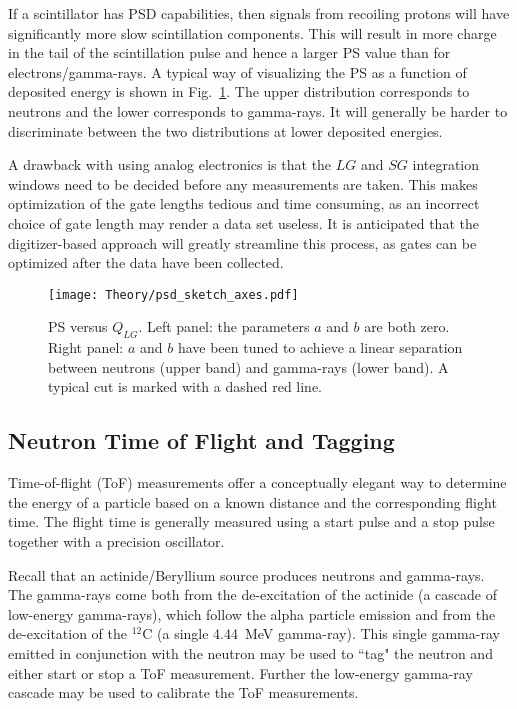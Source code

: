 \documentclass[main.tex]{subfiles}
\begin{document}
If a scintillator has PSD capabilities, then signals from recoiling protons will have significantly more slow scintillation components. This will result in more charge in the tail of the scintillation pulse and hence a larger PS value than for electrons/gamma-rays. A typical way of visualizing the PS as a function of deposited energy is shown in Fig.~\ref{fig:psd_sketch}. The upper distribution corresponds to neutrons and the lower corresponds to gamma-rays. It will generally be harder to discriminate between the two distributions at lower deposited energies.

A drawback with using analog electronics is that the $LG$ and $SG$ integration windows need to be decided before any measurements are taken. This makes optimization of the gate lengths tedious and time consuming, as an incorrect choice of gate length may render a data set useless. It is anticipated that the digitizer-based approach will greatly streamline this process, as gates can be optimized after the data have been collected.
\begin{figure}[ht]
    \centering
        \texttt{[image: Theory/psd\_sketch\_axes.pdf]}
        \caption[PS versus $Q_{LG}$.]{PS versus $Q_{LG}$. Left panel: the parameters $a$ and $b$ are both zero. Right panel: $a$ and $b$ have been tuned to achieve a linear separation between neutrons (upper band) and gamma-rays (lower band). A typical cut is marked with a dashed red line.}
    \label{fig:psd_sketch} 
\end{figure}


\subsection{Neutron Time of Flight and Tagging}\label{sec:tof}
Time-of-flight (ToF) measurements offer a conceptually elegant way to determine the energy of a particle based on a known distance and the corresponding flight time. The flight time is generally measured using a start pulse and a stop pulse together with a precision oscillator.

Recall that an actinide/Beryllium source produces neutrons and gamma-rays. The gamma-rays come both from the de-excitation of the actinide (a cascade of low-energy gamma-rays), which follow the alpha particle emission and from the de-excitation of the $^\textrm{12}$C (a single \SI{4.44}{\MeV} gamma-ray). This single gamma-ray emitted in conjunction with the neutron may be used to ``tag" the neutron and either start or stop a ToF measurement. Further the low-energy gamma-ray cascade may be used to calibrate the ToF measurements.
\end{document}
